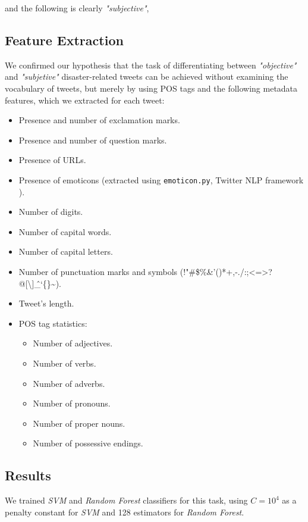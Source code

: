 \documentclass[letterpaper,twocolumn,10pt]{article}
\begin{document}
and the following is clearly \textit{"subjective"},

\begin{center}
	\parbox{190pt}{}
\end{center}

\subsection{Feature Extraction}

We confirmed our hypothesis that the task of differentiating between \textit{"objective"} and \textit{"subjetive"} disaster-related tweets can be achieved without examining the vocabulary of tweets, but merely by using POS tags and the following metadata features, which we extracted for each tweet:


\begin{itemize}[noitemsep, nolistsep]
	\item Presence and number of exclamation marks.
	\item Presence and number of question marks.
	\item Presence of URLs.
	\item Presence of emoticons (extracted using \texttt{emoticon.py}, Twitter NLP framework \cite{twitter_nlp}).
	\item Number of digits.
	\item Number of capital words.
	\item Number of capital letters.
	\item Number of punctuation marks and symbols (!"\#\$\%\&'()*+,-./:;<=>?@[\textbackslash]\^\_`\{\}\textasciitilde).
	\item Tweet's length.
	\item POS tag statistics:
		\begin{itemize}[noitemsep, nolistsep]
			\item Number of adjectives.
			\item Number of verbs.
			\item Number of adverbs.
			\item Number of pronouns.
			\item Number of proper nouns.
			\item Number of possessive endings.
		\end{itemize}
\end{itemize}

\subsection{Results}
We trained \textit{SVM} and \textit{Random Forest} classifiers for this task, using $ C=10^4 $ as a penalty constant for \textit{SVM} and 128 estimators for \textit{Random Forest}.
\end{document}
